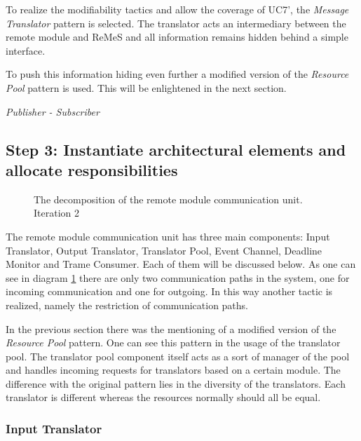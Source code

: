 \npar To realize the modifiability tactics and allow the coverage of UC7', the
\emph{Message Translator} pattern is selected. The translator acts an
intermediary between the remote module and ReMeS and all information remains
hidden behind a simple interface. 

\npar To push this information hiding even further a modified version of the
\emph{Resource Pool} pattern is used. This will be enlightened in the next
section.


\npar \emph{Publisher - Subscriber} %

\subsection{Step 3: Instantiate architectural elements and allocate responsibilities}
\label{add:it2/elements}

\begin{figure}[H]
	\begin{centering}
		\caption{The decomposition of the remote module communication unit. Iteration
		2}
		\label{fig:add/it2/decomposition}
	\end{centering}
\end{figure}

\npar The remote module communication unit has three main components: Input
Translator, Output Translator, Translator Pool, Event Channel, Deadline Monitor
and Trame Consumer. Each of them will be discussed below. As one can see in
diagram \ref{fig:add/it2/decomposition} there are only two communication paths
in the system, one for incoming communication and one for outgoing. In this way
another tactic is realized, namely the restriction of communication paths.

\npar In the previous section there was the mentioning of a modified version of
the \emph{Resource Pool} pattern. One can see this pattern in the usage of the
translator pool. The translator pool component itself acts as a sort of manager
of the pool and handles incoming requests for translators based on a
certain module. The difference with the original pattern lies in the 
diversity of the translators. Each translator is different whereas the
resources normally should all be equal. 

\subsubsection{Input Translator}


